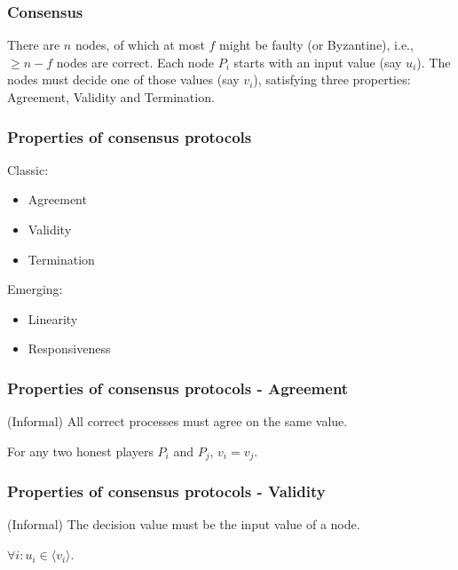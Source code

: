 \documentclass{beamer}
\begin{document}
\begin{frame}
\frametitle{Consensus}


\begin{definition}[Consensus]
There are $n$ nodes, of which at most $f$ might be faulty (or Byzantine), i.e., $\geq n-f$ nodes are correct.
Each node $P_i$ starts with an input value (say $u_i$).
The nodes must decide one of those values (say $v_i$), satisfying three properties: Agreement, Validity and Termination.
\end{definition}

\end{frame}

\begin{frame}
    \frametitle{Properties of consensus protocols}

    Classic:

    \begin{itemize}
        \item Agreement
        \item Validity
        \item Termination
    \end{itemize}

    Emerging:

    \begin{itemize}
        \item Linearity
        \item Responsiveness
    \end{itemize}

\end{frame}

\begin{frame}
\frametitle{Properties of consensus protocols - Agreement}

(Informal) All correct processes must agree on the same value.

\begin{definition}[Agreement]
For any two honest players $P_i$ and $P_j$, $v_i = v_j$.
\end{definition}

\end{frame}


\begin{frame}
\frametitle{Properties of consensus protocols - Validity}

(Informal) The decision value must be the input value of a node.

\begin{definition}[Validity]
$\forall i: u_i \in \langle v_i \rangle$.
\end{definition}

\end{frame}
\end{document}
